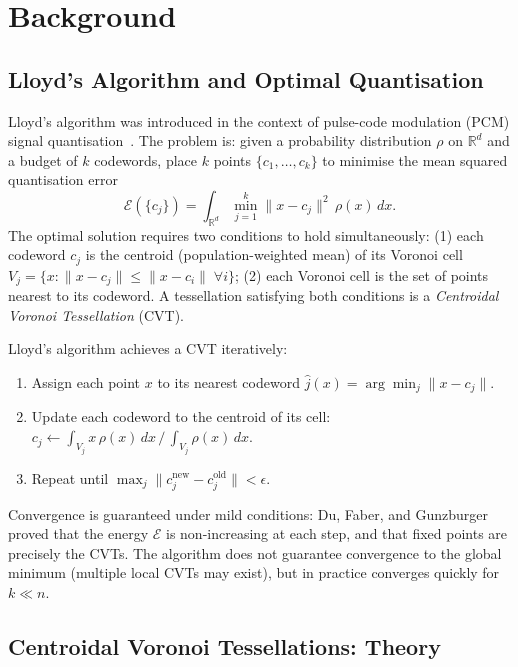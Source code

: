 \section{Background}
\label{sec:background}

\subsection{Lloyd's Algorithm and Optimal Quantisation}

Lloyd's algorithm was introduced in the context of pulse-code modulation
(PCM) signal quantisation~\citep{lloyd1982}.
The problem is: given a probability distribution $\rho$ on $\mathbb{R}^d$
and a budget of $k$ codewords, place $k$ points $\{c_1,\ldots,c_k\}$ to
minimise the mean squared quantisation error
\[
  \mathcal{E}(\{c_j\}) = \int_{\mathbb{R}^d}
  \min_{j=1}^{k} \|x - c_j\|^2 \, \rho(x) \, dx.
\]
The optimal solution requires two conditions to hold simultaneously:
(1) each codeword $c_j$ is the centroid (population-weighted mean) of its
Voronoi cell $V_j = \{x : \|x - c_j\| \le \|x - c_i\| \; \forall i\}$;
(2) each Voronoi cell is the set of points nearest to its codeword.
A tessellation satisfying both conditions is a \emph{Centroidal Voronoi
Tessellation} (CVT).

Lloyd's algorithm achieves a CVT iteratively:
\begin{enumerate}
\item Assign each point $x$ to its nearest codeword $\hat{j}(x) = \arg\min_j \|x - c_j\|$.
\item Update each codeword to the centroid of its cell:
  $c_j \leftarrow \int_{V_j} x \, \rho(x) \, dx \,/\, \int_{V_j} \rho(x) \, dx$.
\item Repeat until $\max_j \|c_j^{\mathrm{new}} - c_j^{\mathrm{old}}\| < \epsilon$.
\end{enumerate}
Convergence is guaranteed under mild conditions: Du, Faber, and
Gunzburger~\citeyear{du1999} proved that the energy $\mathcal{E}$ is
non-increasing at each step, and that fixed points are precisely the CVTs.
The algorithm does not guarantee convergence to the global minimum (multiple
local CVTs may exist), but in practice converges quickly for $k \ll n$.

\subsection{Centroidal Voronoi Tessellations: Theory}

